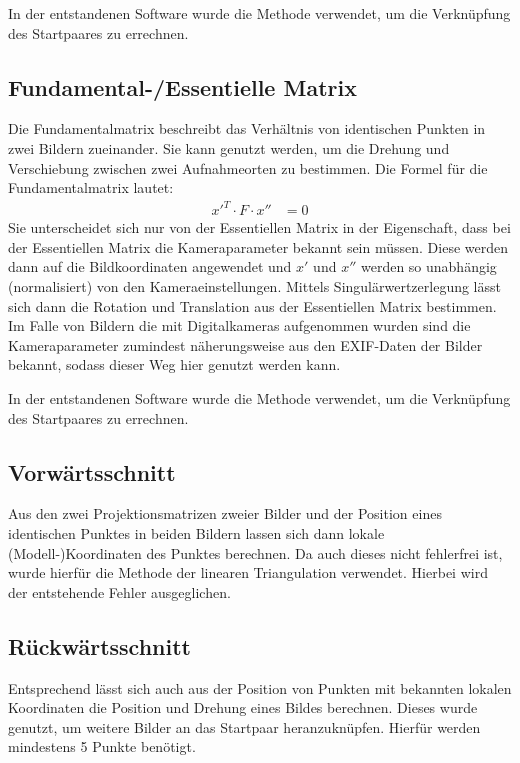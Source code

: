 \documentclass[a4paper,12pt,bibliography=totoc, listof=totoc,titlepage]{scrreprt}
\begin{document}
In der entstandenen Software wurde die Methode verwendet, um die Verknüpfung des Startpaares zu errechnen.

\subsection{Fundamental-/Essentielle Matrix}
Die Fundamentalmatrix beschreibt das Verhältnis von identischen Punkten in zwei Bildern zueinander. Sie kann genutzt werden, um die Drehung und Verschiebung zwischen zwei Aufnahmeorten zu bestimmen. Die Formel für die Fundamentalmatrix lautet:
\begin{align}
    x'^T \cdot F \cdot x'' & = 0
\end{align}
Sie unterscheidet sich nur von der Essentiellen Matrix in der Eigenschaft, dass bei der Essentiellen Matrix die Kameraparameter bekannt sein müssen. Diese werden dann auf die Bildkoordinaten angewendet und $x'$ und $x''$ werden so unabhängig (normalisiert) von den Kameraeinstellungen. Mittels Singulärwertzerlegung lässt sich dann die Rotation und Translation aus der Essentiellen Matrix bestimmen. Im Falle von Bildern die mit Digitalkameras aufgenommen wurden sind die Kameraparameter zumindest näherungsweise aus den EXIF-Daten der Bilder bekannt, sodass dieser Weg hier genutzt werden kann. \citep[S. 257]{hartley}

In der entstandenen Software wurde die Methode verwendet, um die Verknüpfung des Startpaares zu errechnen.

\subsection{Vorwärtsschnitt}
Aus den zwei Projektionsmatrizen zweier Bilder und der Position eines identischen Punktes in beiden Bildern lassen sich dann lokale (Modell-)Koordinaten des Punktes berechnen. Da auch dieses nicht fehlerfrei ist, wurde hierfür die Methode der linearen Triangulation verwendet. Hierbei wird der entstehende Fehler ausgeglichen. \citep[S.312]{hartley}

\subsection{Rückwärtsschnitt}
Entsprechend lässt sich auch aus der Position von Punkten mit bekannten lokalen Koordinaten die Position und Drehung eines Bildes berechnen. Dieses wurde genutzt, um weitere Bilder an das Startpaar heranzuknüpfen. Hierfür werden mindestens 5 Punkte benötigt. \citep[S. 533ff]{hartley}
\end{document}
